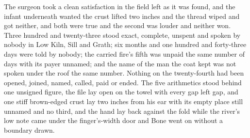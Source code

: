The surgeon took a clean satisfaction in the field left as it was found, and the infant underneath wanted the crust lifted two inches and the thread wiped and got neither, and both were true and the second was louder and neither won. Three hundred and twenty-three stood exact, complete, unspent and spoken by nobody in Low Kiln, Sill and Grath; six months and one hundred and forty-three days were told by nobody; the carried fire's fifth was unpaid the same number of days with its payer unnamed; and the name of the man the coat kept was not spoken under the roof the same number. Nothing on the twenty-fourth had been opened, joined, named, called, paid or ended. The five arithmetics stood behind one unsigned figure, the file lay open on the towel with every gap left gap, and one stiff brown-edged crust lay two inches from his ear with its empty place still unnamed and no third, and the hand lay back against the fold while the river's low note came under the finger's-width door and Bone went on without a boundary drawn.
